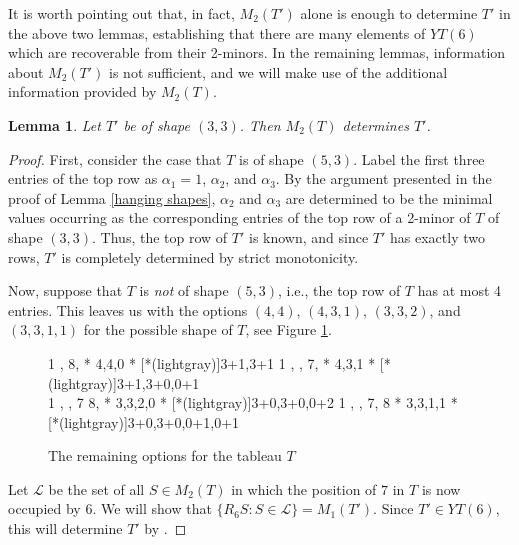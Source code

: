 \documentclass[12pt]{amsart}
\newtheorem{lemma}[theorem]{Lemma}
\theoremstyle{definition}
\theoremstyle{remark}
\numberwithin{equation}{section}
\numberwithin{figure}{section}
\begin{document}
It is worth pointing out that, in fact, $M_2(T')$ alone is enough to determine $T'$ in the above two lemmas, establishing that there are many elements of $YT(6)$ which are recoverable from their 2-minors. In the remaining lemmas, information about $M_2(T')$ is not sufficient, and we will make use of the additional information provided by $M_2(T)$.

\begin{lemma} \label{3-3}
	Let $T'$ be of shape $(3,3)$. Then $M_2(T)$ determines $T'$.
\end{lemma}

\begin{proof}
	
	First, consider the case that $T$ is of shape $(5,3)$. Label the first three entries of the top row as $\alpha_1=1$, $\alpha_2$, and $\alpha_3$. By the argument presented in the proof of Lemma \ref{hanging shapes}, $\alpha_2$ and $\alpha_3$ are determined to be the minimal values occurring as the corresponding entries of the top row of a 2-minor of $T$ of shape $(3,3)$. Thus, the top row of $T'$ is known, and since $T'$ has exactly two rows, $T'$ is completely determined by strict monotonicity.
	
	Now, suppose that $T$ is \emph{not} of shape $(5,3)$, i.e., the top row of $T$ has at most 4 entries.	This leaves us with the options $(4,4)$, $(4,3,1)$, $(3,3,2)$, and $(3,3,1,1)$ for the possible shape of $T$, see Figure \ref{figure: 4 tableaux}.

	\begin{figure}[H]
		\centering
    \ytableaushort
        {1 \none{},
        \none{} 8, \none}
        * {4,4,0}
        * [*(lightgray)]{3+1,3+1}
		\;\;\;\;\;\;\;
    \ytableaushort
        {1 \none{}, \none{},
        {7,}}
        * {4,3,1}
        * [*(lightgray)]{3+1,3+0,0+1}
  \\[.5cm]
    \ytableaushort
        {1 \none\none, \none{},
        7 8, \none}
        * {3,3,2,0}
        * [*(lightgray)]{3+0,3+0,0+2}
		\;\;\;\;\;\;\;
    \ytableaushort
        {1 \none\none, \none{}, 7,
        8}
        * {3,3,1,1}
        * [*(lightgray)]{3+0,3+0,0+1,0+1}
		\caption{The remaining options for the tableau $T$}
		\label{figure: 4 tableaux}
	\end{figure}
	
	Let $\mathcal L$ be the set of all $S\in M_2(T)$ in which the position of $7$ in $T$ is now occupied by $6$. We will show that  $\{R_{6}S:S\in \mathcal L\}=M_1(T')$. Since $T'\in YT(6)$, this will determine $T'$ by \cite{Monks2009}.
	

\end{proof}
\end{document}
